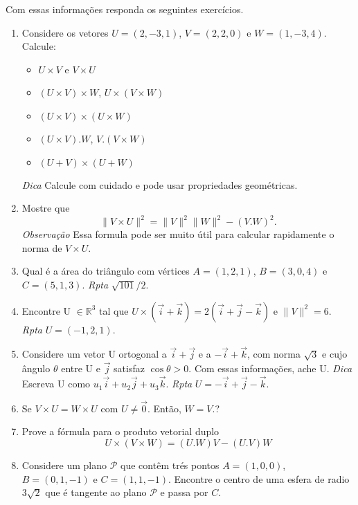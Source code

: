 \documentclass{article}
\theoremstyle{plain}
\theoremstyle{definition}
\theoremstyle{remark}
\begin{document}
  Com essas informações responda os seguintes exercícios.
  
  \begin{enumerate}
  \item Considere os vetores 
  $U=(2,-3,1)$, $V=(2,2,0)$ e $W=(1,-3,4)$. Calcule:
    \begin{itemize}
     \item  $U \times V$ e $V \times U$
     \item $(U \times V) \times W$, $U \times (V \times W)$
     \item $(U \times V ) \times (U \times W)$
     \item $(U \times V).W$, $V.(V \times W)$
     \item $(U + V )\times (U + W)$
    \end{itemize}
  {\it Dica} Calcule com cuidado e pode usar propriedades geométricas.  
  \item Mostre que 
  $$\|V \times U\|^{2}= \|V\|^{2}\|W\|^{2}-(V. W)^{2}.$$
  {\it Observação} Essa formula pode ser muito útil para calcular 
  rapidamente o norma de  $V \times U$.
  \item Qual é a área do triângulo com vértices $A=(1,2,1)$, 
  $B=(3,0,4)$ e $C=(5,1,3)$. {\it Rpta} $\sqrt{101}/2$.
  \item Encontre U $\in \mathbb{R}^{3}$ tal que 
  $U \times (\overrightarrow{i}+\overrightarrow{k})=
  2(\overrightarrow{i}+\overrightarrow{j}-\overrightarrow{k})$
  e $\|V\|^{2}=6$. {\it Rpta} $U=(-1,2,1)$.
  \item Considere um vetor U ortogonal a 
  $\overrightarrow{i}+\overrightarrow{j}$
  e a $-\overrightarrow{i}+\overrightarrow{k}$, 
  com norma $\sqrt{3}$
  e cujo ângulo $\theta$ entre U e $\overrightarrow{j}$
  satisfaz $\cos \theta>0$. Com essas informações, ache U.
  {\it Dica} Escreva U como $u_{1}\overrightarrow{i}+u_2\overrightarrow{j}+u_3\overrightarrow{k}$. 
  {\it Rpta} $U=-\overrightarrow{i}+\overrightarrow{j}-\overrightarrow{k}$.
  \item Se $V \times U= W\times U$ com 
  $U \neq \overrightarrow{0}$. Então, $W=V$.?
  \item Prove a fórmula para o produto vetorial duplo
  $$ U \times (V \times W)=(U.W)V-(U.V)W$$
  \item Considere um plano $\mathcal{P}$ 
  que contêm trés pontos $A=(1,0,0)$, $B=(0,1,-1)$ e 
  $C=(1,1,-1)$.
  Encontre o centro de uma esfera de radio $3\sqrt{2}$ que 
  é tangente ao plano $\mathcal{P}$ e passa por $C$.
  

\end{enumerate}
\end{document}
